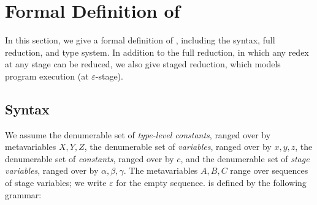 
\section{Formal Definition of \LMD \label{sec:formal-definition}}
\label{sec:formal}

In this section, we give a formal definition of \LMD, including
the syntax, full reduction, and type system.  In addition to the full reduction,
in which any redex at any stage can be reduced, we also give staged reduction,
which models program execution (at \(\varepsilon\)-stage).

\subsection{Syntax}

We assume the denumerable set of \emph{type-level constants}, ranged over by
metavariables \(X, Y, Z\), the denumerable set of \emph{variables}, ranged
over by \(x,y,z\), the denumerable set of \emph{constants}, ranged over by
\(c\), and the denumerable set of \emph{stage variables}, ranged over by
\(\alpha, \beta, \gamma\).  The metavariables \(A, B, C\) range over
sequences of stage variables; we write \(\varepsilon\) for the empty
sequence. \LMD is defined by the following grammar:

